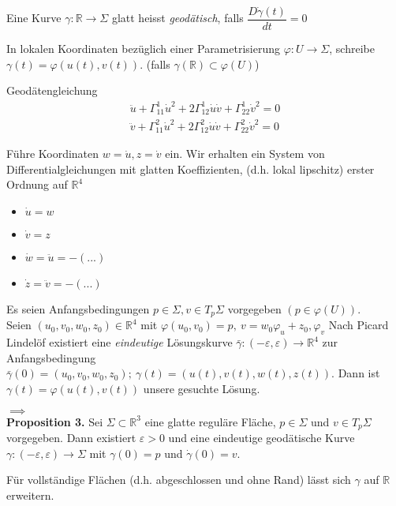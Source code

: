 \documentclass[../main.tex]{subfiles}
\begin{document}

\begin{recall}
    Eine Kurve $\gamma : \mathbb{R} \to \Sigma$ glatt heisst \emph{geodätisch}, falls
$\dfrac{D\dot{\gamma}(t)}{dt}=0$
\end{recall}

In lokalen Koordinaten bezüglich einer Parametrisierung
$\varphi : U \to \Sigma$, schreibe \\ $\gamma (t) = \varphi(u(t),v(t))$.
(falls $\gamma(\mathbb{R}) \subset \varphi(U)$)

Geodätengleichung
\begin{align*}
    \ddot{u} + \Gamma^1_{11}\dot{u}^2 + 2 \Gamma^1_{12}\dot{u}\dot{v} + \Gamma^1_{22}\dot{v}^2 = 0 \\
    \ddot{v} + \Gamma^2_{11}\dot{u}^2 + 2 \Gamma^2_{12}\dot{u}\dot{v} + \Gamma^2_{22}\dot{v}^2 = 0 
\end{align*}

Führe Koordinaten $w=\dot{u}, z=\dot{v}$ ein. Wir erhalten ein System von Differentialgleichungen 
mit glatten Koeffizienten, (d.h. lokal lipschitz) erster Ordnung auf $\mathbb{R}^4$
\begin{itemize}
    \item $\dot{u} = w$
    \item $\dot{v} = z$
    \item $\dot{w} = \ddot{u} = -(...)$
    \item $\dot{z} = \ddot{v} = -(...)$
\end{itemize}

Es seien Anfangsbedingungen $p \in \Sigma, v \in T_p\Sigma$ vorgegeben $(p\in \varphi(U))$. \\
Seien $(u_0,v_0,w_0,z_0) \in \mathbb{R}^4$ mit $\varphi(u_0,v_0) = p, \  v = w_0\varphi_u+z_0,\varphi_v$
Nach Picard Lindelöf existiert eine \emph{eindeutige} Lösungskurve
$\bar{\gamma}: (-\varepsilon,\varepsilon) \to \mathbb{R}^4$ zur Anfangsbedingung $\bar{\gamma}(0)=(u_0,v_0,w_0,z_0); \ \gamma(t)=(u(t),v(t),w(t),z(t))$.
Dann ist $\gamma(t) = \varphi(u(t),v(t))$ unsere gesuchte Lösung.

$\implies$ \\
\textbf{Proposition 3.} Sei $\Sigma \subset \mathbb{R}^3$ eine glatte reguläre Fläche, $p \in \Sigma$
und $v\in T_p\Sigma$ vorgegeben. Dann existiert $\varepsilon >0$ und eine 
eindeutige geodätische Kurve $\gamma : (-\varepsilon, \varepsilon)\to \Sigma$ mit $\gamma(0)=p$
und $\dot{\gamma}(0)=v$.

\begin{zusatz}
    Für vollständige Flächen (d.h. abgeschlossen und ohne Rand) lässt sich
    $\gamma$ auf $\mathbb{R}$ erweitern.
\end{zusatz}
\end{document}
